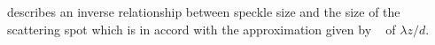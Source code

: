  describes an inverse relationship between speckle
size and the size of the scattering spot which is in accord with the
approximation given by ~\cite{dainty1975laser} of $\lambda z/d$.


